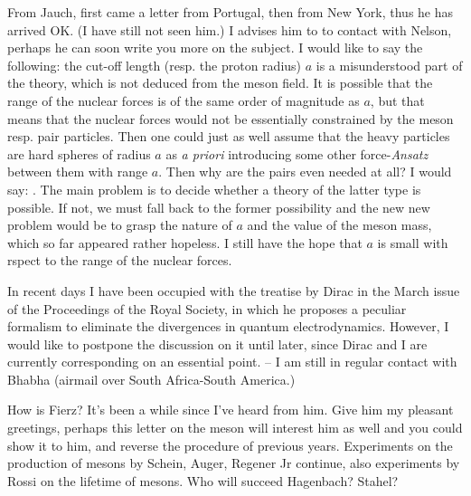From Jauch, first came a letter from Portugal, then from New York, thus he has arrived OK. (I have still not seen him.) I advises him to  to contact with
 Nelson, perhaps he can soon write you more on the subject.  I would like to say the following: the cut-off length (resp. the proton radius) $a$ is a misunderstood part of the theory, which is not deduced from the meson field. It is possible that the range of the nuclear forces is of the same order of magnitude as $a$, but that means that the nuclear forces would not be essentially constrained by the meson resp. pair particles. Then one could just as well assume that the heavy particles are hard spheres of radius $a$ as \textit{a priori} introducing some other force-\textit{Ansatz} between them with range $a$. Then why are the pairs even needed at all? I would say: . The main problem is to decide whether a theory of the latter type is possible. If not, we must fall back to the former possibility and the new new problem would be to grasp the nature of $a$ and the value of the meson mass, which so far appeared rather hopeless. I still have the hope that $a$ is small with rspect to the range of the nuclear forces.

In recent days I have been occupied with the treatise by Dirac in the March issue of the Proceedings of the Royal Society, in which he proposes a peculiar formalism to eliminate the divergences in quantum electrodynamics. However, I would like to postpone the discussion on it until later, since Dirac and I are currently corresponding on an essential point. --  I am still in regular contact with Bhabha (airmail over South Africa-South America.)

How is Fierz? It's been a while since I've heard from him. Give him my pleasant greetings, perhaps this letter on the meson will interest him as well and you could show it to him, and reverse the procedure of previous years. Experiments on the production of mesons by Schein, Auger, Regener Jr continue, also experiments by Rossi on the lifetime of mesons. Who will succeed Hagenbach? Stahel?

